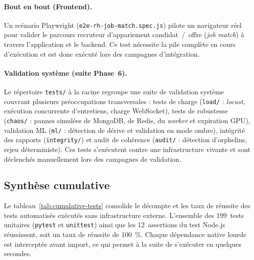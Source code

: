 \paragraph{Bout en bout (Frontend).} Un scénario Playwright
(\texttt{e2e-rh-job-match.spec.js}) pilote un navigateur réel pour valider le parcours
recruteur d'appariement candidat~/~offre (\textit{job match}) à travers l'application et le
backend. Ce test nécessite la pile complète en cours d'exécution et est donc exécuté lors des
campagnes d'intégration.

\paragraph{Validation système (suite Phase~6).} Le répertoire \texttt{tests/} à la racine
regroupe une suite de validation système couvrant plusieurs préoccupations transversales :
tests de charge (\texttt{load/} : \textit{locust}, exécution concurrente d'entretiens, charge
WebSocket), tests de robustesse (\texttt{chaos/} : pannes simulées de MongoDB, de Redis, du
\textit{worker} et expiration GPU), validation ML (\texttt{ml/} : détection de dérive et
validation en mode ombre), intégrité des rapports (\texttt{integrity/}) et audit de cohérence
(\texttt{audit/} : détection d'orphelins, rejeu déterministe). Ces tests s'exécutent contre une
infrastructure vivante et sont déclenchés manuellement lors des campagnes de validation.

\subsection{Synthèse cumulative}

Le tableau~\ref{tab:cumulative-tests} consolide le décompte et les taux de réussite des tests
automatisés exécutés sans infrastructure externe. L'ensemble des 199~tests unitaires
(\texttt{pytest} et \texttt{unittest}) ainsi que les 12~assertions du test Node.js réussissent,
soit un taux de réussite de 100~\%. Chaque dépendance native lourde est interceptée avant import,
ce qui permet à la suite de s'exécuter en quelques secondes.

